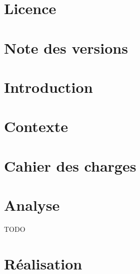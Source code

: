 \documentclass[12pt]{report}
\begin{document}

	\setcounter{page}{1}

	\chapter*{Licence}
	\clearpage

	\renewcommand{\thepage}{\roman{page}}

	\tableofcontents
	\clearpage

	\renewcommand{\thepage}{\arabic{page}}

	\chapter{Note des versions}
	\label{ch:versions}

	

	\chapter{Introduction}
	\label{ch:introduction}

		

	\chapter{Contexte}
	\label{ch:context}

	    

	\chapter{Cahier des charges}
	\label{ch:specifications}

		

	\chapter{Analyse}
	\label{ch:analysis}

		TODO

	\chapter{Réalisation}
	\label{ch:implementation}
\end{document}
